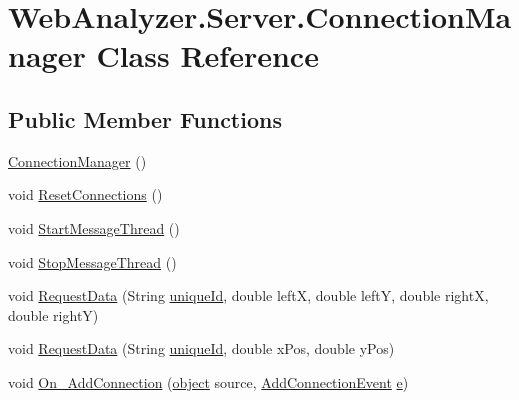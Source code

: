 \hypertarget{class_web_analyzer_1_1_server_1_1_connection_manager}{}\section{Web\+Analyzer.\+Server.\+Connection\+Manager Class Reference}
\label{class_web_analyzer_1_1_server_1_1_connection_manager}
\subsection*{Public Member Functions}
\begin{DoxyCompactItemize}
\item 
\hyperlink{class_web_analyzer_1_1_server_1_1_connection_manager_ae034fe5148cccbcc759a56abd68bb51a}{Connection\+Manager} ()
\item 
void \hyperlink{class_web_analyzer_1_1_server_1_1_connection_manager_a7fa4617d21e13ed0302001e70ff0f79c}{Reset\+Connections} ()
\item 
void \hyperlink{class_web_analyzer_1_1_server_1_1_connection_manager_a6f743e94d77ce575913e2c504cab5057}{Start\+Message\+Thread} ()
\item 
void \hyperlink{class_web_analyzer_1_1_server_1_1_connection_manager_a8cbad625ff934cf233a70ecc2af26d95}{Stop\+Message\+Thread} ()
\item 
void \hyperlink{class_web_analyzer_1_1_server_1_1_connection_manager_a2237bfa6cf4791e578b37e75624b70df}{Request\+Data} (String \hyperlink{_u_i_2_h_t_m_l_resources_2js_2lib_2underscore_8min_8js_af690ff5521d79c7128861033ae80ae17}{unique\+Id}, double left\+X, double left\+Y, double right\+X, double right\+Y)
\item 
void \hyperlink{class_web_analyzer_1_1_server_1_1_connection_manager_a8b3ba4008dc9ee54a092c532132df757}{Request\+Data} (String \hyperlink{_u_i_2_h_t_m_l_resources_2js_2lib_2underscore_8min_8js_af690ff5521d79c7128861033ae80ae17}{unique\+Id}, double x\+Pos, double y\+Pos)
\item 
void \hyperlink{class_web_analyzer_1_1_server_1_1_connection_manager_a912992bce817cbf9177db239f7716a1e}{On\+\_\+\+Add\+Connection} (\hyperlink{_u_i_2_h_t_m_l_resources_2js_2lib_2underscore_8min_8js_aae18b7515bb2bc4137586506e7c0c903}{object} source, \hyperlink{class_web_analyzer_1_1_events_1_1_add_connection_event}{Add\+Connection\+Event} \hyperlink{_u_i_2_h_t_m_l_resources_2js_2lib_2bootstrap_8min_8js_ab5902775854a8b8440bcd25e0fe1c120}{e})
\end{DoxyCompactItemize}
